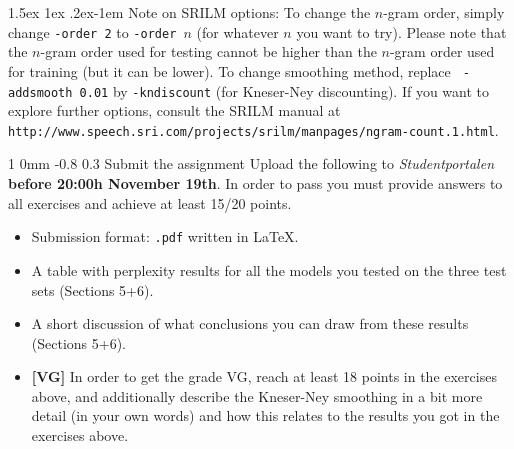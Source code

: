 \documentclass[11pt]{article}
\makeatletter
\newcommand{\newsec}[2]{\section{#1}\label{sec:#2}\noindent}
\renewcommand{\section}{\@startsection
{section}%
{1}%
{0mm}%
{-0.8\baselineskip}%
{0.3\baselineskip}%
{\bfseries\large}}%
\renewcommand{\paragraph}{%
  \@startsection{paragraph}{4}%
  {\z@}{1.5ex \@plus 1ex \@minus .2ex}{-1em}%
  {\normalfont\normalsize\bfseries}%
}\makeatother
\makeatother
\begin{document}
\paragraph{Note on SRILM options:} To change the $n$-gram order,
simply change {\tt -order\,2} to {\tt -order\,$n$} (for whatever $n$
you want to try).  Please note that the $n$-gram order used for
testing cannot be higher than the $n$-gram order used for training
(but it can be lower). To change smoothing method, replace {\tt
  -addsmooth\,0.01} by {\tt -kndiscount} (for Kneser-Ney
discounting). If you want to explore further options, consult the
SRILM manual at {\small {\tt
    http://www.speech.sri.com/projects/srilm/manpages/ngram-count.1.html}}.

\newsec{Submit the assignment}{submit}%
Upload the following to {\it Studentportalen}
\textbf{before 20:00h November 19th}. In order to pass you must
provide answers to all exercises and achieve at least 15/20 points.

\begin{itemize}[noitemsep,topsep=0.2cm]
\item Submission format: \texttt{.pdf} written in \LaTeX.
\item A table with perplexity results for all the models you tested on
  the three test sets (Sections 5+6).
\item A short discussion of what conclusions you can draw from these
  results (Sections 5+6).
\item \textbf{[VG]} In order to get the grade VG, reach at least 18
  points in the exercises above, and additionally describe the
  Kneser-Ney smoothing in a bit more detail (in your own words) and
  how this relates to the results you got in the exercises above.

\end{itemize}
\end{document}
